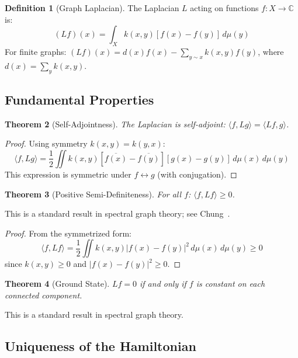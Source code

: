 \documentclass[11pt,a4paper]{article}
\theoremstyle{plain}
\newtheorem{theorem}{Theorem}[section]
\theoremstyle{definition}
\newtheorem{definition}[theorem]{Definition}
\theoremstyle{remark}
\begin{document}
\begin{definition}[Graph Laplacian]
The Laplacian $L$ acting on functions $f: X \to \mathbb{C}$ is:
\begin{equation}
(Lf)(x) = \int_X k(x,y)[f(x) - f(y)]\, d\mu(y)
\end{equation}
For finite graphs: $(Lf)(x) = d(x)f(x) - \sum_{y \sim x} k(x,y)f(y)$, where $d(x) = \sum_y k(x,y)$.
\end{definition}

\subsection{Fundamental Properties}

\begin{theorem}[Self-Adjointness]
The Laplacian is self-adjoint: $\langle f, Lg \rangle = \langle Lf, g \rangle$.
\end{theorem}

\begin{proof}
Using symmetry $k(x,y) = k(y,x)$:
\begin{equation}
\langle f, Lg \rangle = \frac{1}{2}\iint k(x,y)[\overline{f(x)} - \overline{f(y)}][g(x) - g(y)]\, d\mu(x)\,d\mu(y)
\end{equation}
This expression is symmetric under $f \leftrightarrow g$ (with conjugation).
\end{proof}

\begin{theorem}[Positive Semi-Definiteness]
For all $f$: $\langle f, Lf \rangle \geq 0$.
\end{theorem}

This is a standard result in spectral graph theory; see Chung~\cite{chung}.

\begin{proof}
From the symmetrized form:
\begin{equation}
\langle f, Lf \rangle = \frac{1}{2}\iint k(x,y)|f(x) - f(y)|^2\, d\mu(x)\,d\mu(y) \geq 0
\end{equation}
since $k(x,y) \geq 0$ and $|f(x) - f(y)|^2 \geq 0$.
\end{proof}

\begin{theorem}[Ground State]
$Lf = 0$ if and only if $f$ is constant on each connected component.
\end{theorem}

This is a standard result in spectral graph theory.

\subsection{Uniqueness of the Hamiltonian}
\end{document}

